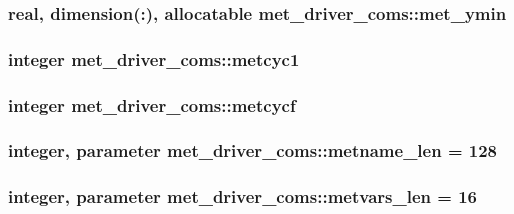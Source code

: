 \subsubsection[{\texorpdfstring{met\+\_\+ymin}{met_ymin}}]{\setlength{\rightskip}{0pt plus 5cm}real, dimension(\+:), allocatable met\+\_\+driver\+\_\+coms\+::met\+\_\+ymin}\hypertarget{namespacemet__driver__coms_af9ef42e3bc6984aedb394f464c861d2a}{}\label{namespacemet__driver__coms_af9ef42e3bc6984aedb394f464c861d2a}
\subsubsection[{\texorpdfstring{metcyc1}{metcyc1}}]{\setlength{\rightskip}{0pt plus 5cm}integer met\+\_\+driver\+\_\+coms\+::metcyc1}\hypertarget{namespacemet__driver__coms_a1bdb4a13bac006468d76ccc158d7d3e1}{}\label{namespacemet__driver__coms_a1bdb4a13bac006468d76ccc158d7d3e1}
\subsubsection[{\texorpdfstring{metcycf}{metcycf}}]{\setlength{\rightskip}{0pt plus 5cm}integer met\+\_\+driver\+\_\+coms\+::metcycf}\hypertarget{namespacemet__driver__coms_a9a06bc94d2fbf01d6d9ef295ba9f3887}{}\label{namespacemet__driver__coms_a9a06bc94d2fbf01d6d9ef295ba9f3887}
\subsubsection[{\texorpdfstring{metname\+\_\+len}{metname_len}}]{\setlength{\rightskip}{0pt plus 5cm}integer, parameter met\+\_\+driver\+\_\+coms\+::metname\+\_\+len = 128}\hypertarget{namespacemet__driver__coms_a8dc2e2ece34bf7b8bd355e602f477c66}{}\label{namespacemet__driver__coms_a8dc2e2ece34bf7b8bd355e602f477c66}
\subsubsection[{\texorpdfstring{metvars\+\_\+len}{metvars_len}}]{\setlength{\rightskip}{0pt plus 5cm}integer, parameter met\+\_\+driver\+\_\+coms\+::metvars\+\_\+len = 16}\hypertarget{namespacemet__driver__coms_af6adda2378b0db677d6ea2016d8cf4b3}{}\label{namespacemet__driver__coms_af6adda2378b0db677d6ea2016d8cf4b3}
